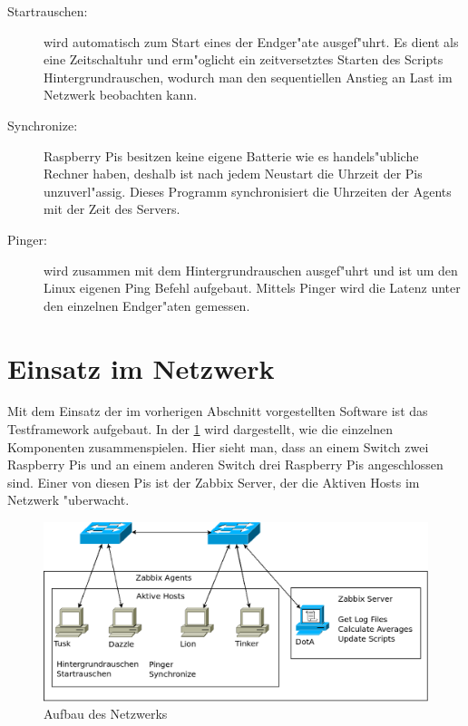 \begin{enumerate}
\begin{description}
\item[Startrauschen:]wird automatisch zum Start eines der Endger"ate ausgef"uhrt. Es dient als eine Zeitschaltuhr %
und erm"oglicht ein zeitversetztes Starten des Scripts Hintergrundrauschen, wodurch man den sequentiellen %
Anstieg an Last im Netzwerk beobachten kann.

\item[Synchronize:]Raspberry Pis besitzen keine eigene Batterie wie es handels"ubliche Rechner haben, %
deshalb ist nach jedem Neustart die Uhrzeit der Pis unzuverl"assig. Dieses Programm synchronisiert %
die Uhrzeiten der Agents mit der Zeit des Servers. %

\item[Pinger:]wird zusammen mit dem Hintergrundrauschen ausgef"uhrt und ist um den Linux eigenen Ping Befehl %
aufgebaut. Mittels Pinger wird die Latenz unter den einzelnen Endger"aten gemessen. %
\end{description}
\end{enumerate}
\section{Einsatz im Netzwerk} 

Mit dem Einsatz der im vorherigen Abschnitt vorgestellten Software ist das Testframework aufgebaut. In der \cref{fig:AufbauVomNetzwerk} %
wird dargestellt, wie die einzelnen Komponenten zusammenspielen. Hier sieht man, dass an einem Switch zwei Raspberry Pis %
und an einem anderen Switch drei Raspberry Pis angeschlossen sind. Einer von diesen Pis ist der Zabbix Server, der %
die Aktiven Hosts im Netzwerk "uberwacht. 

\label{sec:einsatzImNetzwerk}
\begin{figure}[htbp]
\centering
\includegraphics*[width=0.9\linewidth]{Abb/Netzschaltung3}

\caption{Aufbau des Netzwerks}
\label{fig:AufbauVomNetzwerk}
\end{figure}














